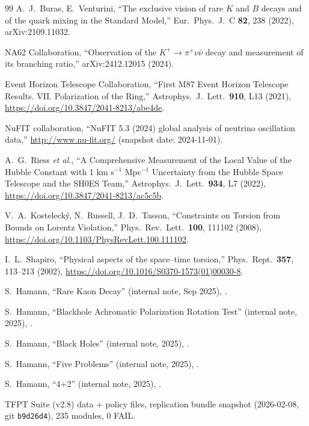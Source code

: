 \begin{thebibliography}{99}
A.~J.~Buras, E.~Venturini,
``The exclusive vision of rare $K$ and $B$ decays and of the quark mixing in the Standard Model,''
Eur.\ Phys.\ J.\ C \textbf{82}, 238 (2022), arXiv:2109.11032.

NA62 Collaboration,
``Observation of the $K^+ \to \pi^+ \nu\bar{\nu}$ decay and measurement of its branching ratio,''
arXiv:2412.12015 (2024).

Event Horizon Telescope Collaboration,
``First M87 Event Horizon Telescope Results. VII. Polarization of the Ring,''
Astrophys.\ J.\ Lett.\ \textbf{910}, L13 (2021),
\url{https://doi.org/10.3847/2041-8213/abe4de}.

NuFIT collaboration,
``NuFIT 5.3 (2024) global analysis of neutrino oscillation data,''
\url{http://www.nu-fit.org/} (snapshot date: 2024-11-01).

A.~G.~Riess \textit{et al.},
``A Comprehensive Measurement of the Local Value of the Hubble Constant with 1 km s$^{-1}$ Mpc$^{-1}$ Uncertainty from the Hubble Space Telescope and the SH0ES Team,''
Astrophys.\ J.\ Lett.\ \textbf{934}, L7 (2022),
\url{https://doi.org/10.3847/2041-8213/ac5c5b}.

V.~A.~Kosteleck\'y, N.~Russell, J.~D.~Tasson,
``Constraints on Torsion from Bounds on Lorentz Violation,''
Phys.\ Rev.\ Lett.\ \textbf{100}, 111102 (2008),
\url{https://doi.org/10.1103/PhysRevLett.100.111102}.

I.~L.~Shapiro,
``Physical aspects of the space--time torsion,''
Phys.\ Rept.\ \textbf{357}, 113--213 (2002),
\url{https://doi.org/10.1016/S0370-1573(01)00030-8}.

S.~Hamann,
``Rare Kaon Decay'' (internal note, Sep 2025),
\mbox{}.

S.~Hamann,
``Blackhole Achromatic Polarization Rotation Test'' (internal note, 2025),
.

S.~Hamann,
``Black Holes'' (internal note, 2025),
.

S.~Hamann,
``Five Problems'' (internal note, 2025),
.

S.~Hamann,
``4+2'' (internal note, 2025),
.

TFPT Suite (v2.8) data + policy files, replication bundle snapshot (2026-02-08, git \texttt{b9d26d4}),
235 modules, 0 FAIL.
\end{thebibliography}


